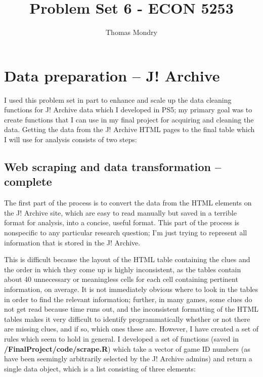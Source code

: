 \documentclass{article}
\title{Problem Set 6 - ECON 5253}
\author{Thomas Mondry}
\begin{document}
\maketitle

\section{Data preparation -- J! Archive}

I used this problem set in part to enhance and scale up the data cleaning functions for J! Archive data which I developed in PS5; my primary goal was to create functions that I can use in my final project for acquiring and cleaning the data. Getting the data from the J! Archive HTML pages to the final table which I will use for analysis consists of two steps:

\subsection{Web scraping and data transformation -- complete}

The first part of the process is to convert the data from the HTML elements on the J! Archive site, which are easy to read manually but saved in a terrible format for analysis, into a concise, useful format. This part of the process is nonspecific to any particular research question; I'm just trying to represent all information that is stored in the J! Archive.

This is difficult because the layout of the HTML table containing the clues and the order in which they come up is highly inconsistent, as the tables contain about 40 unnecessary or meaningless cells for each cell containing pertinent information, on average. It is not immediately obvious where to look in the tables in order to find the relevant information; further, in many games, some clues do not get read because time runs out, and the inconsistent formatting of the HTML tables makes it very difficult to identify programmatically whether or not there are missing clues, and if so, which ones these are. However, I have created a set of rules which seem to hold in general. I developed a set of functions (saved in \textbf{/FinalProject/code/scrape.R}) which take a vector of game ID numbers (as have been seemingly arbitrarily selected by the J! Archive admins) and return a single data object, which is a list consisting of three elements:
\end{document}
